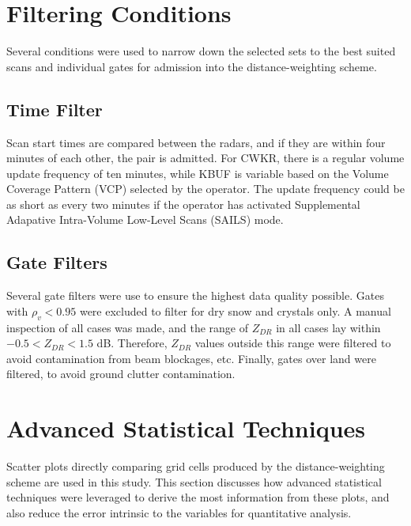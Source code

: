\section{Filtering Conditions}
Several conditions were used to narrow down the selected sets to the best suited scans and individual gates for admission into the distance-weighting scheme.
\subsection{Time Filter}
Scan start times are compared between the radars, and if they are within four minutes of each other, the pair is admitted. For CWKR, there is a regular
volume update frequency of ten minutes, while KBUF is variable based on the Volume Coverage Pattern (VCP) selected by the operator. The update frequency
could be as short as every two minutes if the operator has activated Supplemental Adapative Intra-Volume Low-Level Scans (SAILS) mode.
\subsection{Gate Filters}
Several gate filters were use to ensure the highest data quality possible. Gates with $\rho_{v} < 0.95$ were excluded to filter for dry snow and crystals
only. A manual inspection of all cases was made, and the range of $Z_{DR}$ in all cases lay within $-0.5 < Z_{DR} < 1.5$ dB. Therefore, $Z_{DR}$ values
outside this range were filtered to avoid contamination from beam blockages, etc. Finally, gates over land were filtered, to avoid ground clutter
contamination.
\section{Advanced Statistical Techniques}
Scatter plots directly comparing grid cells produced by the distance-weighting scheme are used in this study. This section discusses how advanced statistical
techniques were leveraged to derive the most information from these plots, and also reduce the error intrinsic to the variables for quantitative analysis.
